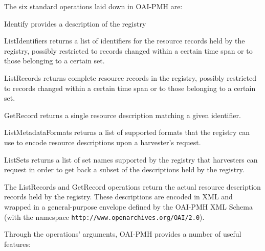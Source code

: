 \documentclass{ivoa}
\begin{document}
The six standard operations laid down in OAI-PMH are:


\begin{bigdescription}
\item[Identify] provides a description of the registry

\item[ListIdentifiers]returns a list of identifiers for the resource
records held by the registry, possibly restricted to records changed
within a certain time span or to those belonging to a certain set.

\item[ListRecords]returns complete resource records in the registry,
possibly restricted to records changed within a certain time span or to
those belonging to a certain set.

\item[GetRecord]returns a single resource description matching a given
identifier.

\item[ListMetadataFormats]returns a list of supported formats that the
registry can use to encode resource descriptions upon a harvester's
request.

\item[ListSets]returns a list of set names supported by the registry
that harvesters can request in order to get back a subset of the
descriptions held by the registry.

\end{bigdescription}

The ListRecords and GetRecord operations return the actual resource
description records held by the registry. These descriptions are encoded
in XML and wrapped in a general-purpose envelope defined by the OAI-PMH
XML Schema (with the namespace
\texttt{http://www.openarchives.org/OAI/2.0}).

Through the operations' arguments, OAI-PMH provides a number of useful
features:
\end{document}
